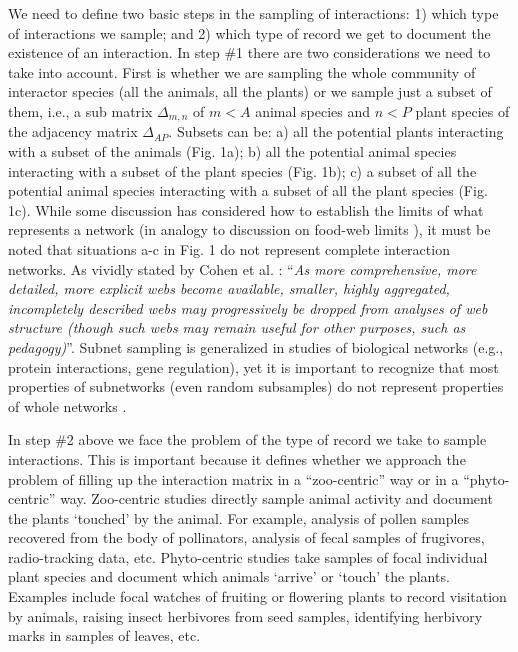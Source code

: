 \documentclass[12pt]{article}
\begin{document}
We need to define two basic steps in the sampling of interactions: 1) which type of interactions we sample; and 2) which type of record we get to document the existence of an interaction. In step \#1 there are two considerations we need to take into account. First is whether we are sampling the whole community of interactor species (all the animals, all the plants) or we sample just a subset of them, i.e., a sub matrix $\Delta_{m,n}$ of $m < A$ animal species and $n <  P$ plant species of the adjacency matrix $\Delta_{AP}$. Subsets can be: a) all the potential plants interacting with a subset of the animals (Fig. 1a); b) all the potential animal species interacting with a subset of the plant species (Fig. 1b); c) a subset of all the potential animal species interacting with a subset of all the plant species (Fig. 1c). While some discussion has considered how to establish the limits of what represents a network \citep{Strogatz:2001wc} (in analogy to discussion on food-web limits \citep{Cohen:1978}), it must be noted that situations a-c in Fig. 1 do not represent complete interaction networks. As vividly stated by Cohen et al. \citeyearpar{Cohen:1993aa}: ``\emph{As more comprehensive, more detailed, more explicit webs become available, smaller, highly aggregated, incompletely described webs may progressively be dropped from analyses of web structure (though such webs may remain useful for other purposes, such as pedagogy)}''. Subnet sampling is generalized in studies of biological networks (e.g., protein interactions, gene regulation), yet it is important to recognize that most properties of subnetworks (even random subsamples) do not represent properties of whole networks \citep{Stumpf:2005tn}. 


In step \#2 above we face the problem of the type of record we take to sample interactions. This is important because it defines whether we approach the problem of filling up the interaction matrix in a ``zoo-centric'' way or in a ``phyto-centric'' way. Zoo-centric studies directly sample animal activity and document the plants `touched' by the animal. For example, analysis of pollen samples recovered from the body of pollinators, analysis of fecal samples of frugivores, radio-tracking data, etc. Phyto-centric studies take samples of focal individual plant species and document which animals `arrive' or `touch' the plants. Examples include focal watches of fruiting or flowering plants to record visitation by animals, raising insect herbivores from seed samples, identifying herbivory marks in samples of leaves, etc. 
\end{document}

